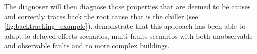 The diagnoser will then diagnose those properties that are deemed to be causes and correctly traces back the root cause that is the chiller (see \autoref{fig:backtracking_example}).
\textcite{semantic_diagnoser} demonstrate that this approach has been able to adapt to delayed effects scenarios, multi faults scenarios with both unobservable and observable faults and to more complex buildings.
